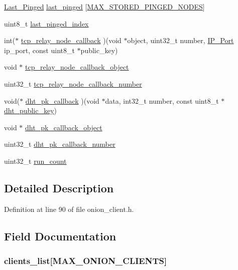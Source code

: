 \begin{DoxyCompactItemize}
\hyperlink{struct_last___pinged}{Last\+\_\+\+Pinged} \hyperlink{struct_onion___friend_a27015cced65360814a59652b662ef143}{last\+\_\+pinged} \mbox{[}\hyperlink{onion__client_8h_a95b6f5386cd87cd64fcee1c2b7ee2a31}{M\+A\+X\+\_\+\+S\+T\+O\+R\+E\+D\+\_\+\+P\+I\+N\+G\+E\+D\+\_\+\+N\+O\+D\+E\+S}\mbox{]}
\item 
uint8\+\_\+t \hyperlink{struct_onion___friend_a6e0a5214a3dffa151dd52dc4c230145b}{last\+\_\+pinged\+\_\+index}
\item 
int($\ast$ \hyperlink{struct_onion___friend_a62001c45ecd44d4c6321ca2358f4df5f}{tcp\+\_\+relay\+\_\+node\+\_\+callback} )(void $\ast$object, uint32\+\_\+t number, \hyperlink{struct_i_p___port}{I\+P\+\_\+\+Port} ip\+\_\+port, const uint8\+\_\+t $\ast$public\+\_\+key)
\item 
void $\ast$ \hyperlink{struct_onion___friend_a0da74cebd5ec2859b1de5db74c0dc528}{tcp\+\_\+relay\+\_\+node\+\_\+callback\+\_\+object}
\item 
uint32\+\_\+t \hyperlink{struct_onion___friend_ab673fb84fe578fb5e7848f9f04c093cf}{tcp\+\_\+relay\+\_\+node\+\_\+callback\+\_\+number}
\item 
void($\ast$ \hyperlink{struct_onion___friend_ab0f780a41ece58bf84d8460e71cbdbb3}{dht\+\_\+pk\+\_\+callback} )(void $\ast$data, int32\+\_\+t number, const uint8\+\_\+t $\ast$\hyperlink{struct_onion___friend_ab2ecaa07625ad0ed5e07d3a1f0dcc939}{dht\+\_\+public\+\_\+key})
\item 
void $\ast$ \hyperlink{struct_onion___friend_ab5d618d73b8d83fb07209433e7b448ee}{dht\+\_\+pk\+\_\+callback\+\_\+object}
\item 
uint32\+\_\+t \hyperlink{struct_onion___friend_ab0413da421baacf312141b8ae3ec7762}{dht\+\_\+pk\+\_\+callback\+\_\+number}
\item 
uint32\+\_\+t \hyperlink{struct_onion___friend_a9b6e91b90249c9b72d98611ba5ed7176}{run\+\_\+count}
\end{DoxyCompactItemize}


\subsection{Detailed Description}


Definition at line 90 of file onion\+\_\+client.\+h.



\subsection{Field Documentation}
\hypertarget{struct_onion___friend_a6797ac2f59ba5ef59a8a70cd6515ca25}{
\subsubsection[{clients\+\_\+list}]{ clients\+\_\+list\mbox{[}{\bf M\+A\+X\+\_\+\+O\+N\+I\+O\+N\+\_\+\+C\+L\+I\+E\+N\+T\+S}\mbox{]}}}\label{struct_onion___friend_a6797ac2f59ba5ef59a8a70cd6515ca25}


